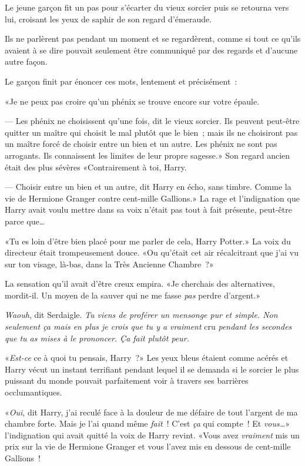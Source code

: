 Le jeune garçon fit un pas pour s'écarter du vieux sorcier puis se retourna vers lui, croisant les yeux de saphir de son regard d'émeraude.

Ils ne parlèrent pas pendant un moment et se regardèrent, comme si tout ce qu'ils avaient à se dire pouvait seulement être communiqué par des regards et d'aucune autre façon.

Le garçon finit par énoncer ces mots, lentement et précisément~:

«Je ne peux pas croire qu'un phénix se trouve encore sur votre épaule.

--- Les phénix ne choisissent qu'une fois, dit le vieux sorcier. Ils peuvent peut-être quitter un maître qui choisit le mal plutôt que le bien~; mais ils ne choisiront pas un maître forcé de choisir entre un bien et un autre. Les phénix ne sont pas arrogants. Ils connaissent les limites de leur propre sagesse.» Son regard ancien était des plus sévères «Contrairement à toi, Harry.

--- Choisir entre un bien et un autre, dit Harry en écho, sans timbre. Comme la vie de Hermione Granger contre cent-mille Gallions.» La rage et l'indignation que Harry avait voulu mettre dans sa voix n'était pas tout à fait présente, peut-être parce que…

«Tu es loin d'être bien placé pour me parler de cela, Harry Potter.» La voix du directeur était trompeusement douce. «Ou qu'était cet air récalcitrant que j'ai vu sur ton visage, là-bas, dans la Très Ancienne Chambre~?»

La sensation qu'il avait d'être creux empira. «Je cherchais des alternatives, mordit-il. Un moyen de la sauver qui ne me fasse \emph{pas} perdre d'argent.»

\emph{Waouh}, dit Serdaigle. \emph{Tu viens de proférer un mensonge pur et simple. Non seulement ça mais en plus je crois que tu y a vraiment} cru \emph{pendant les secondes que tu as mises à le prononcer. Ça fait plutôt peur.}

«\emph{Est-ce} ce à quoi tu pensais, Harry~?» Les yeux bleus étaient comme acérés et Harry vécut un instant terrifiant pendant lequel il se demanda si le sorcier le plus puissant du monde pouvait parfaitement voir à travers ses barrières occlumantiques.

«\emph{Oui}, dit Harry, j'ai reculé face à la douleur de me défaire de tout l'argent de ma chambre forte. Mais je l'ai quand même \emph{fait}~! C'est \emph{ça} qui compte~! Et \emph{vous…}» l'indignation qui avait quitté la voix de Harry revint. «Vous avez \emph{vraiment} mis un prix sur la vie de Hermione Granger et vous l'avez mis en dessous de cent-mille Gallions~!

